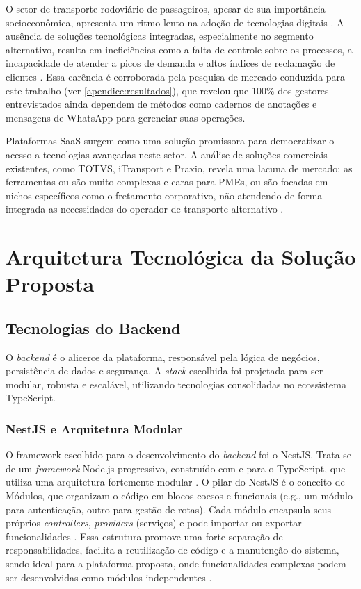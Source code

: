 O setor de transporte rodoviário de passageiros, apesar de sua importância socioeconômica, apresenta um ritmo lento na adoção de tecnologias digitais \cite{sestsenat2021relatorio}. A ausência de soluções tecnológicas integradas, especialmente no segmento alternativo, resulta em ineficiências como a falta de controle sobre os processos, a incapacidade de atender a picos de demanda e altos índices de reclamação de clientes \cite{fateczl2022impactos}. Essa carência é corroborada pela pesquisa de mercado conduzida para este trabalho (ver \autoref{apendice:resultados}), que revelou que 100\% dos gestores entrevistados ainda dependem de métodos como cadernos de anotações e mensagens de WhatsApp para gerenciar suas operações.

Plataformas SaaS surgem como uma solução promissora para democratizar o acesso a tecnologias avançadas neste setor. A análise de soluções comerciais existentes, como TOTVS, iTransport e Praxio, revela uma lacuna de mercado: as ferramentas ou são muito complexas e caras para PMEs, ou são focadas em nichos específicos como o fretamento corporativo, não atendendo de forma integrada as necessidades do operador de transporte alternativo \cite{totvs2025passageiros, itransport2025gestao, praxioluna2025venda}.

\section{Arquitetura Tecnológica da Solução Proposta}

\subsection{Tecnologias do Backend}

O \textit{backend} é o alicerce da plataforma, responsável pela lógica de negócios, persistência de dados e segurança. A \textit{stack} escolhida foi projetada para ser modular, robusta e escalável, utilizando tecnologias consolidadas no ecossistema TypeScript.

\subsubsection{NestJS e Arquitetura Modular}
O framework escolhido para o desenvolvimento do \textit{backend} foi o NestJS. Trata-se de um \textit{framework} Node.js progressivo, construído com e para o TypeScript, que utiliza uma arquitetura fortemente modular \cite{nestjs2025framework}. O pilar do NestJS é o conceito de Módulos, que organizam o código em blocos coesos e funcionais (e.g., um módulo para autenticação, outro para gestão de rotas). Cada módulo encapsula seus próprios \textit{controllers}, \textit{providers} (serviços) e pode importar ou exportar funcionalidades \cite{nestjs2025modules}. Essa estrutura promove uma forte separação de responsabilidades, facilita a reutilização de código e a manutenção do sistema, sendo ideal para a plataforma proposta, onde funcionalidades complexas podem ser desenvolvidas como módulos independentes \cite{devanddeliver2024architecture}.

